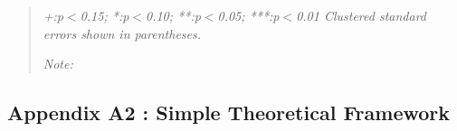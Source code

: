 

\newpage
\begin{center}
\begin{table}[!htbp]
\caption{}
\vspace{5mm}


\begin{quote}
\vspace{5mm}

\emph{+:p$<$0.15; *:p$<$0.10; **:p$<$0.05; ***:p$<$0.01 
\newline
Clustered standard errors shown in parentheses.}

\vspace{5mm}

\emph{Note:} 
\end{quote}
\label{tab:reg_chart_qual}
\end{table}
\end{center}




\newpage
\FloatBarrier

\subsection{Appendix A2 : Simple Theoretical Framework}
\label{sec:theory}






